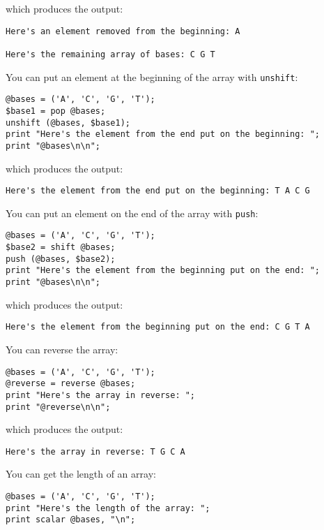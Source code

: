 which produces the output:

\begin{lstlisting}
Here's an element removed from the beginning: A

Here's the remaining array of bases: C G T
\end{lstlisting}

You can put an element at the beginning of the array with \verb|unshift|: 

\begin{lstlisting}
@bases = ('A', 'C', 'G', 'T');
$base1 = pop @bases;
unshift (@bases, $base1);
print "Here's the element from the end put on the beginning: ";
print "@bases\n\n";
\end{lstlisting}

which produces the output:

\begin{lstlisting}
Here's the element from the end put on the beginning: T A C G
\end{lstlisting}

You can put an element on the end of the array with \verb|push|: 

\begin{lstlisting}
@bases = ('A', 'C', 'G', 'T');
$base2 = shift @bases;
push (@bases, $base2);
print "Here's the element from the beginning put on the end: ";
print "@bases\n\n";
\end{lstlisting}

which produces the output:

\begin{lstlisting}
Here's the element from the beginning put on the end: C G T A
\end{lstlisting}

You can reverse the array: 

\begin{lstlisting}
@bases = ('A', 'C', 'G', 'T');
@reverse = reverse @bases;
print "Here's the array in reverse: ";
print "@reverse\n\n";
\end{lstlisting}

which produces the output:

\begin{lstlisting}
Here's the array in reverse: T G C A
\end{lstlisting}

You can get the length of an array:

\begin{lstlisting}
@bases = ('A', 'C', 'G', 'T');
print "Here's the length of the array: ";
print scalar @bases, "\n";
\end{lstlisting}


